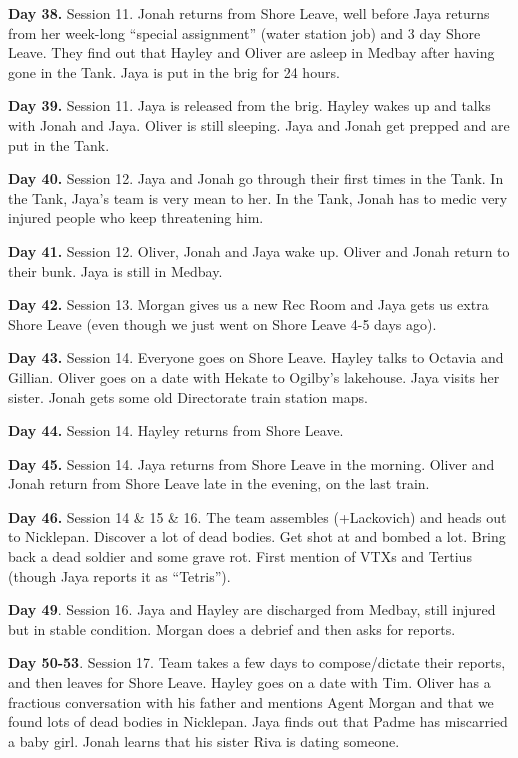 \textbf{Day 38.} Session 11. Jonah returns from Shore Leave, well before Jaya returns from her week-long ``special assignment'' (water station job) and 3 day Shore Leave.  They find out that Hayley and Oliver are asleep in Medbay after having gone in the Tank.  Jaya is put in the brig for 24 hours.

\textbf{Day 39.} Session 11. Jaya is released from the brig.  Hayley wakes up and talks with Jonah and Jaya.  Oliver is still sleeping.  Jaya and Jonah get prepped and are put in the Tank.

\textbf{Day 40.} Session 12. Jaya and Jonah go through their first times in the Tank.  In the Tank, Jaya's team is very mean to her.  In the Tank, Jonah has to medic very injured people who keep threatening him.

\textbf{Day 41.} Session 12. Oliver, Jonah and Jaya wake up.  Oliver and Jonah return to their bunk.  Jaya is still in Medbay.

\textbf{Day 42.} Session 13. Morgan gives us a new Rec Room and Jaya gets us extra Shore Leave (even though we just went on Shore Leave 4-5 days ago).

\textbf{Day 43. }Session 14. Everyone goes on Shore Leave.  Hayley talks to Octavia and Gillian.  Oliver goes on a date with Hekate to Ogilby's lakehouse.  Jaya visits her sister.  Jonah gets some old Directorate train station maps.

\textbf{Day 44. }Session 14.  Hayley returns from Shore Leave.

\textbf{Day 45. }Session 14. Jaya returns from Shore Leave in the morning.  Oliver and Jonah return from Shore Leave late in the evening, on the last train.

\textbf{Day 46. }Session 14 \& 15 \& 16.  The team assembles (+Lackovich) and heads out to Nicklepan.  Discover a lot of dead bodies.  Get shot at and bombed a lot.  Bring back a dead soldier and some grave rot.  First mention of VTXs and Tertius (though Jaya reports it as ``Tetris'').

\textbf{Day 49}.  Session 16. Jaya and Hayley are discharged from Medbay, still injured but in stable condition.  Morgan does a debrief and then asks for reports.

\textbf{Day 50-53}.  Session 17.   Team takes a few days to compose/dictate their reports, and then leaves for Shore Leave.  Hayley goes on a date with Tim.  Oliver has a fractious conversation with his father and mentions Agent Morgan and that we found lots of dead bodies in Nicklepan. Jaya finds out that Padme has miscarried a baby girl.  Jonah learns that his sister Riva is dating someone.

